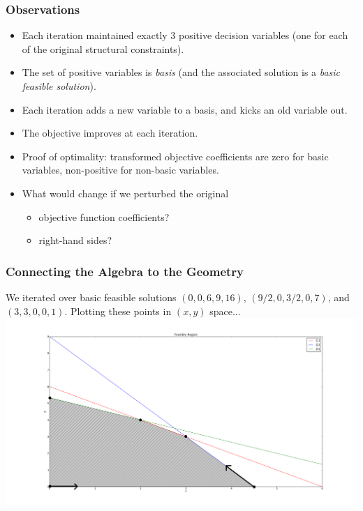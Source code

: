 \documentclass[12pt,handout]{beamer}
\begin{document}
\begin{frame}
\frametitle{Observations}
\begin{itemize}
\item Each iteration maintained exactly 3 positive decision variables (one for each of the original structural constraints).
\item The set of positive variables is {\em basis} (and the associated solution is a {\em basic feasible solution}).
\item Each iteration adds a new variable to a basis, and kicks an old variable out.
\item The objective improves at each iteration.
\item Proof of optimality: transformed objective coefficients are zero for basic variables, non-positive for non-basic variables.
\item What would change if we perturbed the original
\begin{itemize}
\item objective function coefficients?
\item right-hand sides?
\end{itemize}
\end{itemize}
\end{frame}
\begin{frame}
\frametitle{Connecting the Algebra to the Geometry}
We iterated over basic feasible solutions $(0, 0, 6, 9, 16)$, $(9/2, 0, 3/2, 0, 7)$, and $(3, 3, 0, 0, 1)$. Plotting these points in $(x,y)$ space...
\includegraphics[scale=0.15]{simplex_iterations.png}
\end{frame}
\end{document}
